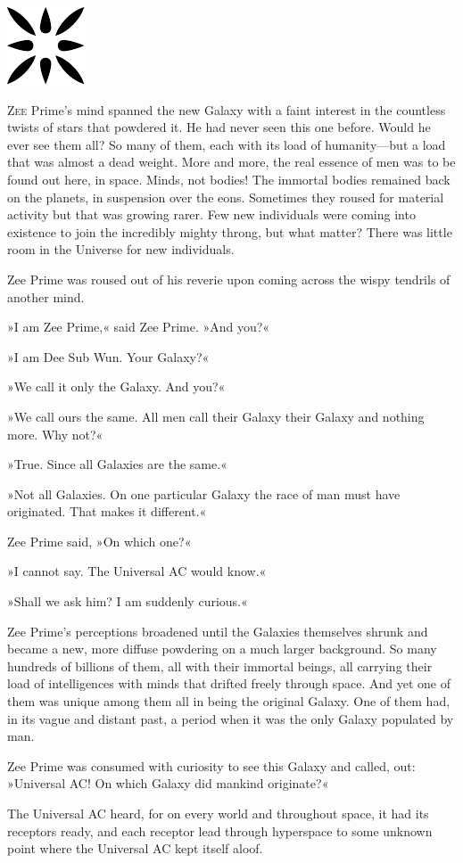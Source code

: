 \documentclass[11pt,twocolumn,paper=a5,pagesize,twoside]{scrartcl}
\newcommand{\q}[1]{»#1«}
\newcommand{\futurethree}[1]{ #1 }
\newcommand{\specialinitialg}[1]{
\lettrine[lines=3,lhang=0.21,nindent=0.1em]{  
\fontspec{Final Frontier}\fontsize{47}{48}\selectfont #1}}
\newcommand{\sepc}[0]{\vspace{.4cm} {\centering 

\includegraphics[scale=0.8]{blackor/o9.pdf}

}\vspace{.4cm}}
\begin{document}
\sepc{}

\futurethree{
\specialinitialg{Z}{ee} Prime's mind spanned the new Galaxy with a faint interest in the 
countless twists of stars that powdered it. He had never seen this one before. 
Would he ever see them all? So many of them, each with its load of 
humanity---but a load that was almost a dead weight. More and more, the real 
essence of men was to be found out here, in space.
Minds, not bodies! The immortal bodies remained back on the planets, in 
suspension over the eons. Sometimes they roused for material activity but that 
was growing rarer. Few new individuals were coming into existence to join the 
incredibly mighty throng, but what matter? There was little room in the 
Universe for new individuals.

Zee Prime was roused out of his reverie upon coming across the wispy tendrils 
of another mind.

\q{I am Zee Prime,} said Zee Prime. \q{And you?}

\q{I am Dee Sub Wun. Your Galaxy?}

\q{We call it only the Galaxy. And you?}

\q{We call ours the same. All men call their Galaxy their Galaxy and nothing 
more. Why not?}

\q{True. Since all Galaxies are the same.}

\q{Not all Galaxies. On one particular Galaxy the race of man must have 
originated. That makes it different.}

Zee Prime said, \q{On which one?}

\q{I cannot say. The Universal AC would know.}

\q{Shall we ask him? I am suddenly curious.}

Zee Prime's perceptions broadened until the Galaxies themselves shrunk and 
became a new, more diffuse powdering on a much larger background. So many 
hundreds of billions of them, all with their immortal beings, all carrying 
their load of intelligences with minds that drifted freely through space. 
And yet one of them was unique among them all in being the original 
Galaxy. One of them had, in its vague and distant past, a period when it 
was the only Galaxy populated by man.

Zee Prime was consumed with curiosity to see this Galaxy and called, out: 
\q{Universal AC! On which Galaxy did mankind originate?}

The Universal AC heard, for on every world and throughout space, it had its 
receptors ready, and each receptor lead through hyperspace to some unknown 
point where the Universal AC kept itself aloof.

}
\end{document}
